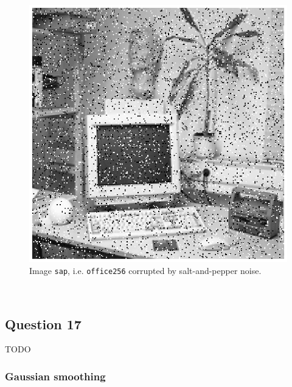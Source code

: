 \begin{minipage}{\linewidth}
\begin{minipage}{0.4\linewidth}
\begin{figure}[H]
      \includegraphics[scale=0.6]{./images/Q17/sap_original.eps}
      \caption{Image \texttt{sap}, i.e. \texttt{office256} corrupted by salt-and-pepper noise.}
      \label{fig:Q17_add_original}
    \end{figure}
  \end{minipage}
\end{minipage}
\\

\subsection{Question 17}

TODO

\subsubsection{Gaussian smoothing}

